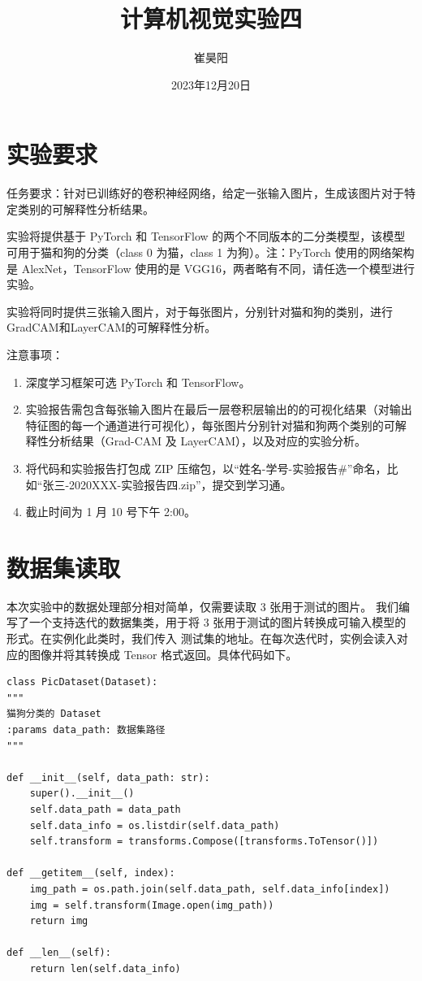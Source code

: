 \documentclass[supercite]{Experimental_Report}
\title{~~~~~~计算机视觉实验四~~~~~~}
\author{崔昊阳}
\date{2023年12月20日}
\theoremstyle{definition}
\begin{document}
\maketitle

\clearpage


\tableofcontents[level=2]

\clearpage


\section{实验要求}
任务要求：针对已训练好的卷积神经网络，给定一张输入图片，生成该图片对于特定类别的可解释性分析结果。

实验将提供基于 PyTorch 和 TensorFlow 的两个不同版本的二分类模型，该模型可用于猫和狗的分类（class 0 为猫，class 1 为狗）。注：PyTorch 使用的网络架构是 AlexNet，TensorFlow 使用的是 VGG16，两者略有不同，请任选一个模型进行实验。

实验将同时提供三张输入图片，对于每张图片，分别针对猫和狗的类别，进行GradCAM和LayerCAM的可解释性分析。

注意事项：
\begin{enumerate}
	\item 深度学习框架可选 PyTorch 和 TensorFlow。
	\item 实验报告需包含每张输入图片在最后一层卷积层输出的的可视化结果（对输出特征图的每一个通道进行可视化），每张图片分别针对猫和狗两个类别的可解释性分析结果（Grad-CAM 及 LayerCAM），以及对应的实验分析。
	\item 将代码和实验报告打包成 ZIP 压缩包，以“姓名-学号-实验报告\#”命名，比如“张三-2020XXX-实验报告四.zip”，提交到学习通。
	\item 截止时间为 1 月 10 号下午 2:00。
\end{enumerate}

\section{数据集读取}
本次实验中的数据处理部分相对简单，仅需要读取 3 张用于测试的图片。
我们编写了一个支持迭代的数据集类，用于将 3 张用于测试的图片转换成可输入模型的形式。在实例化此类时，我们传入
测试集的地址。在每次迭代时，实例会读入对应的图像并将其转换成 Tensor 格式返回。具体代码如下。
\begin{lstlisting}
class PicDataset(Dataset):
"""
猫狗分类的 Dataset
:params data_path: 数据集路径
"""

def __init__(self, data_path: str):
    super().__init__()
    self.data_path = data_path
    self.data_info = os.listdir(self.data_path)
    self.transform = transforms.Compose([transforms.ToTensor()])

def __getitem__(self, index):
    img_path = os.path.join(self.data_path, self.data_info[index])
    img = self.transform(Image.open(img_path))
    return img

def __len__(self):
    return len(self.data_info)
\end{lstlisting}
\end{document}
